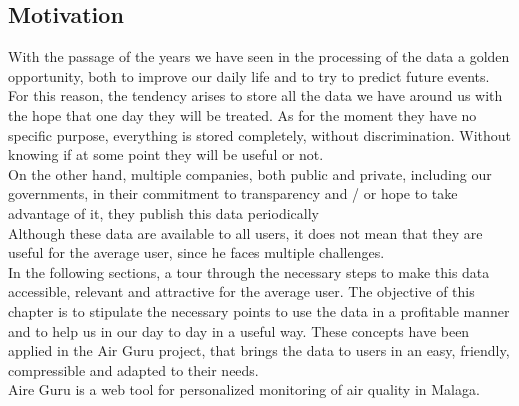 \subsection*{Motivation}

With the passage of the years we have seen in the processing of the data a golden opportunity, 
both to improve our daily life and to try to predict
future events. For this reason, the tendency arises to store all the data we have
around us with the hope that one day they will be treated.
As for the moment they have no specific purpose, everything is stored completely, without discrimination.
Without knowing if at some point they will be useful or not. \\

On the other hand, multiple companies, both public and private, including our governments, 
in their commitment to transparency and / or hope to take advantage of it, they publish this data 
periodically \\

Although these data are available to all users, it does not mean that they are useful for the 
average user, since he faces multiple challenges. \\

In the following sections, a tour through the necessary steps to make this data
accessible, relevant and attractive for the average user.
The objective of this chapter is to stipulate the necessary points to use the data in a profitable manner and
to help us in our day to day in a useful way. These concepts have been applied in the Air Guru project,
that brings the data to users in an easy, friendly, compressible and adapted to their needs. \\

Aire Guru is a web tool for personalized monitoring of air quality in Malaga.
